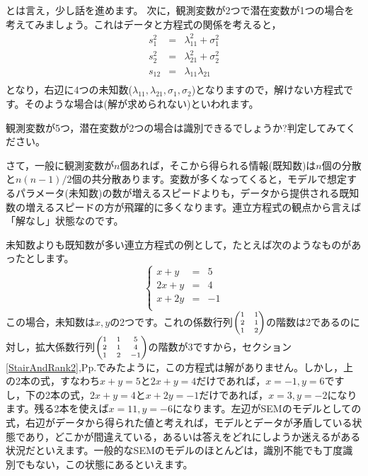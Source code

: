 \documentclass{ltjsbook}
\begin{document}
とは言え，少し話を進めます。
次に，観測変数が2つで潜在変数が1つの場合を考えてみましょう。これはデータと方程式の関係を考えると，
\[
	\begin{array}{lll}
		s_1^2  & = & \lambda_{11}^2 + \sigma_1^2 \\
		s_2^2  & = & \lambda_{21}^2 + \sigma_2^2 \\
		s_{12} & = & \lambda_{11}\lambda_{21}    \\
	\end{array}
\]
となり，右辺に4つの未知数($\lambda_{11},\lambda_{21},\sigma_1,\sigma_2$)となりますので，解けない方程式です。そのような場合は(解が求められない)といわれます。

\begin{reidai}{}{}
	観測変数が5つ，潜在変数が2つの場合は識別できるでしょうか?判定してみてください。
\end{reidai}

さて，一般に観測変数が$n$個あれば，そこから得られる情報(既知数)は$n$個の分散と$n(n-1)/2$個の共分散あります。変数が多くなってくると，モデルで想定するパラメータ(未知数)の数が増えるスピードよりも，データから提供される既知数の増えるスピードの方が飛躍的に多くなります。連立方程式の観点から言えば「解なし」状態なのです。

未知数よりも既知数が多い連立方程式の例として，たとえば次のようなものがあったとします。
\[
	\left\{
	\begin{array}{lll}
		x + y  & = & 5  \\
		2x + y & = & 4  \\
		x + 2y & = & -1 \\
	\end{array}
	\right.
\]
この場合，未知数は$x,y$の2つです。これの係数行列$\scriptsize\begin{pmatrix}1&1\\2&1\\1&2\end{pmatrix}$の階数は2であるのに対し，拡大係数行列$\scriptsize\begin{pmatrix}1&1&5\\2&1&4\\1&2&-1\end{pmatrix}$の階数が3ですから，セクション\ref{StairAndRank2},Pp.\pageref{StairAndRank2}でみたように，この方程式は解がありません。しかし，上の2本の式，すなわち$x+y=5$と$2x+y=4$だけであれば，$x=-1,y=6$ですし，下の2本の式，$2x+y=4$と$x+2y=-1$だけであれば，$x=3,y=-2$になります。残る2本を使えば$x=11,y=-6$になります。左辺がSEMのモデルとしての式，右辺がデータから得られた値と考えれば，モデルとデータが矛盾している状態であり，どこかが間違えている，あるいは答えをどれにしようか迷えるがある状況だといえます。一般的なSEMのモデルのほとんどは，識別不能でも丁度識別でもない，この状態にあるといえます。
\end{document}
